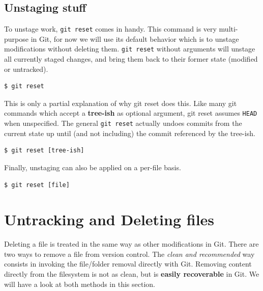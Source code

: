 \documentclass{../../common/tufte-latex/tufte-handout}
\begin{document}
\subsection{Unstaging stuff}

To unstage work, \texttt{git reset} comes in handy.
This command is very multi-purpose in Git, for now we will use its default behavior which is to unstage modifications without deleting them.
\texttt{git reset} without arguments will unstage all currently staged changes, and bring them back to their former state (modified or untracked).


\begin{lstlisting}[style=BashInputStyle]
  $ git reset 
\end{lstlisting}

This is only a partial explanation of why git reset does this.
Like many git commands which accept a \textbf{tree-ish} as optional argument, git reset assumes \texttt{HEAD} when unspecified.
The general \texttt{git reset} actually undoes commits from the current state up until (and not including) the commit referenced by the tree-ish.

\begin{lstlisting}[style=BashInputStyle]
  $ git reset [tree-ish]
\end{lstlisting}

Finally, unstaging can also be applied on a per-file basis.

\begin{lstlisting}[style=BashInputStyle]
  $ git reset [file]
\end{lstlisting}

\section{Untracking and Deleting files}

Deleting a file is treated in the same way as other modifications in Git.
There are two ways to remove a file from version control.
The \textit{clean and recommended} way consists in invoking the file/folder removal directly with Git.
Removing content directly from the filesystem is not as clean, but is \textbf{easily recoverable} in Git.
We will have a look at both methods in this section.
\end{document}

